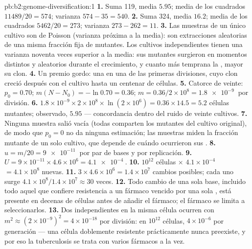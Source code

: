 \begin{solution}{pb:b2:genome-diversification:1}
\textbf{1.} Suma 119, media $5.95$; media de los cuadrados $11489/20 = 574$;
varianza $574 - 35 = 540$.
\textbf{2.} Suma 324, media $16.2$; media de los cuadrados $5462/20 = 273$;
varianza $273 - 262 = 11$.
\textbf{3.} Las muestras de un único cultivo son de Poisson (varianza
próxima a la media): son extracciones aleatorias de una misma fracción
fija de mutantes. Los cultivos independientes tienen una varianza noventa
veces superior a la media: sus mutantes surgieron en momentos distintos y
aleatorios durante el crecimiento, y cuanto más temprana la ,
mayor su clon.
\textbf{4.} Un premio gordo: una  en una de las primeras
divisiones, cuyo clon creció después con el cultivo hasta un centenar de
células.
\textbf{5.} Catorce de veinte: $p_0 = 0.70$; $m(N - N_0) = -\ln 0.70
= 0.36$; $m = 0.36/2\times 10^{8} = \qty{1.8e-9}{}$ por división.
\textbf{6.} $1.8\times 10^{-9}\times 2\times 10^{8}\times \ln(2\times
10^{6}) = 0.36\times 14.5 = 5.2$ células mutantes; observado, $5.95$ ---
concordancia dentro del ruido de veinte cultivos.
\textbf{7.} Ninguna muestra salió vacía (todas comparten los mutantes del
cultivo original), de modo que $p_0 = 0$ no da ninguna estimación; las
muestras miden la fracción mutante de un solo cultivo, que depende de
cuándo ocurrieron sus .
\textbf{8.} $u = m/20 = \qty{9e-11}{}$ por par de bases y por replicación.
\textbf{9.} $U = 9\times 10^{-11}\times 4.6\times 10^{6} =
\qty{4.1e-4}{}$.
\textbf{10.} $10^{12}$ células $\times$ $4.1\times 10^{-4}$ $= 4.1\times
10^{8}$  nuevas.
\textbf{11.} $3\times 4.6\times 10^{6} = 1.4\times 10^{7}$ cambios
posibles; cada uno surge $4.1\times 10^{8}/1.4\times 10^{7} \approx 30$
veces.
\textbf{12.} Todo cambio de una sola base, incluido todo aquel que
confiere resistencia a un fármaco vencido por una sola , está
presente en decenas de células antes de añadir el fármaco; el fármaco
se limita a seleccionarlos.
\textbf{13.} Dos  independientes en la misma célula ocurren con
$m^2 \approx (2\times 10^{-9})^2 = 4\times 10^{-18}$ por división: en
$10^{12}$ células, $4\times 10^{-6}$ por generación --- una célula
doblemente resistente prácticamente nunca preexiste, y por eso la
tuberculosis se trata con varios fármacos a la vez.

\end{solution}
